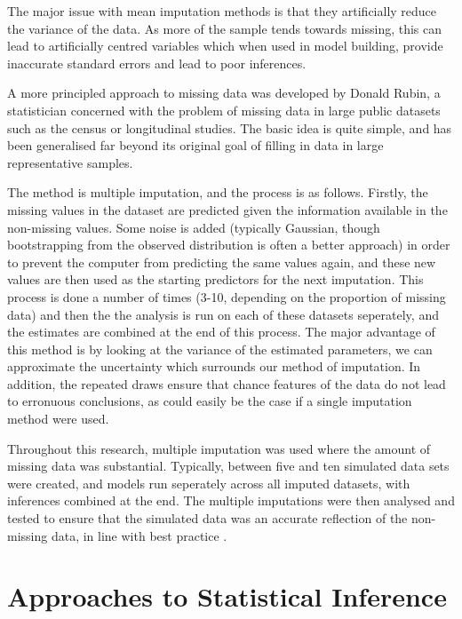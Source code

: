 The major issue with mean imputation methods is that they artificially reduce the variance of the data. As more of the sample tends towards missing, this can lead to artificially centred variables which when used in model building, provide inaccurate standard errors and lead to poor inferences. 

A more principled approach to missing data was developed by Donald Rubin, a statistician concerned with the problem of missing data in large public datasets such as the census or longitudinal studies\cite{little1987statistical}. The basic idea is quite simple, and has been generalised far beyond its original goal of filling in data in large representative samples. 

The method is multiple imputation, and the process is as follows. Firstly, the missing values in the dataset are predicted given the information available in the non-missing values. Some noise is added (typically Gaussian, though bootstrapping from the observed distribution is often a better approach) in order to prevent the computer from predicting the same values again, and these new values are then used as the starting predictors for the next imputation. This process is done a number of times (3-10, depending on the proportion of missing data) \cite{graham2009missing,little1987statistical} and then the the analysis is run on each of these datasets seperately, and the estimates are combined at the end of this process. The major advantage of this method is by looking at the variance of the estimated parameters, we can approximate the uncertainty which surrounds our method of imputation. In addition, the repeated draws ensure that chance features of the data do not lead to erronuous conclusions, as could easily be the case if a single imputation method were used. 

Throughout this research, multiple imputation was used where the amount of missing data was substantial. Typically, between five and ten simulated data sets were created, and models run seperately across all imputed datasets, with inferences combined at the end. The multiple imputations were then analysed and tested to ensure that the simulated data was an accurate reflection of the non-missing data, in line with best practice \cite{abayomi2008diagnostics}.

\section{Approaches to Statistical Inference}

